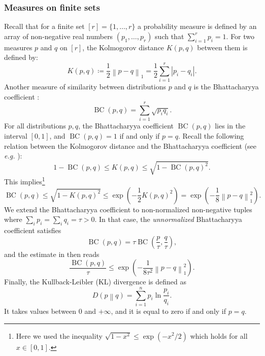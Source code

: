 \documentclass[pdflatex, sn-mathphys-num]{sn-jnl} %
\theoremstyle{plain}
\theoremstyle{definition}
\let\cref\crtcref
\DeclareMathOperator{\BC}{BC} %
\newcommand{\norm}[1]{\left\lVert#1\right\rVert}
\newcommand{\abs}[1]{\left|#1\right|}
\newcommand{\kl}[2]{D\!\left(#1\middle\|#2\right)} %
\begin{document}
\subsubsection{Measures on finite sets}

Recall that for a finite set $[r]=\{ 1, \ldots, r\}$ a probability measure is defined by an array of non-negative real numbers $(p_1, \ldots, p_r)$ such that $\sum_{i=1}^r p_i =1$.
For two measures $p$ and $q$ on $[r]$, the Kolmogorov distance $K(p,q)$ between them is defined by:
\begin{equation}
    K(p,q) \coloneqq \frac{1}{2}\norm{p-q}_1
    = \frac{1}{2} \sum_{i=1}^r \abs{p_i - q_i}.
\end{equation}
Another measure of similarity between distributions $p$ and $q$ is the Bhattacharyya coefficient \cite{bhattacharyya1946measure,fuchs2002cryptographic}:
\begin{equation}
    \label{eq:Bhattacharyya_coefficient}
    \BC(p,q) = \sum_{i=1}^r \sqrt{p_iq_i}.
\end{equation}
For all distributions $p, q$, the Bhattacharyya coefficient $\BC(p,q)$ lies in the interval $[0,1]$, and $\BC(p,q)=1$ if and only if $p=q$.
Recall the following relation between
the Kolmogorov distance and the Bhattacharyya coefficient (see {\em e.g.} \cite[Proposition 5, Equation (41)]{fuchs2002cryptographic}):
\begin{equation}
    1-\BC(p,q) \leq K(p,q) \leq \sqrt{1-\BC(p,q)^2}.
\end{equation}
This implies\footnote{Here we used the inequality $\sqrt{1-x^2} \leq \exp(-x^2/2)$ which holds for all $x \in [0,1]$.}
\begin{equation}
    \label{eq:BC_norm_estimate}
    \BC(p,q) \leq \sqrt{1-K(p,q)^2} \leq \exp\left(- \frac{1}{2} K(p,q)^2\right)=
    \exp\left(- \frac{1}{8} \norm{p-q}_1^2\right).
\end{equation}
We extend the Bhattacharyya coefficient to non-normalized non-negative tuples where $\sum_i p_i = \sum_i q_i = \tau >0$.
In that case, the \textit{unnormalized} Bhattacharyya coefficient satisfies
\begin{equation}
    \BC(p,q) = \tau  \BC\left(\frac{p}{\tau}, \frac{q}{\tau}\right),
\end{equation}
and the estimate in \cref{eq:BC_norm_estimate} then reads
\begin{equation}
    \label{eq:bhattacharyya_vs_distance}
    \frac{\BC(p,q)}{\tau} \leq \exp\left(-\frac{1}{8\tau^2}\norm{p-q}_1^2\right).
\end{equation}
Finally, the Kullback-Leibler (KL) divergence is defined as
\begin{equation}
    \label{eq:KL_divergence}
    \kl{p}{q} = \sum_{i=1}^{n} p_i \ln \frac{p_i}{q_i}.
\end{equation}
It takes values between $0$ and $+\infty$, and it is equal to zero if and only if $p=q$.
\end{document}
